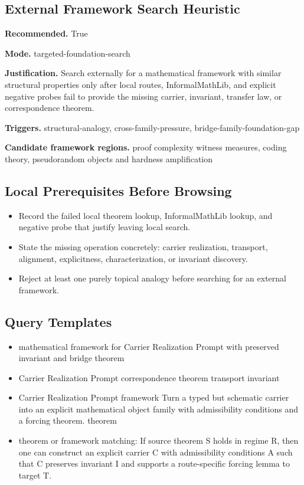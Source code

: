 \documentclass[11pt]{article}
\begin{document}
\subsection*{External Framework Search Heuristic}
\textbf{Recommended.} True

\textbf{Mode.} targeted-foundation-search

\textbf{Justification.} Search externally for a mathematical framework with similar structural properties only after local routes, InformalMathLib, and explicit negative probes fail to provide the missing carrier, invariant, transfer law, or correspondence theorem.

\textbf{Triggers.} structural-analogy, cross-family-pressure, bridge-family-foundation-gap

\textbf{Candidate framework regions.} proof complexity witness measures, coding theory, pseudorandom objects and hardness amplification

\subsection*{Local Prerequisites Before Browsing}
\begin{itemize}[leftmargin=*,itemsep=0.2em]
\item Record the failed local theorem lookup, InformalMathLib lookup, and negative probe that justify leaving local search.
\item State the missing operation concretely: carrier realization, transport, alignment, explicitness, characterization, or invariant discovery.
\item Reject at least one purely topical analogy before searching for an external framework.
\end{itemize}
\subsection*{Query Templates}
\begin{itemize}[leftmargin=*,itemsep=0.2em]
\item mathematical framework for Carrier Realization Prompt with preserved invariant and bridge theorem
\item Carrier Realization Prompt correspondence theorem transport invariant
\item Carrier Realization Prompt framework Turn a typed but schematic carrier into an explicit mathematical object family with admissibility conditions and a forcing theorem. theorem
\item theorem or framework matching: If source theorem S holds in regime R, then one can construct an explicit carrier C with admissibility conditions A such that C preserves invariant I and supports a route-specific forcing lemma to target T.
\end{itemize}
\end{document}
